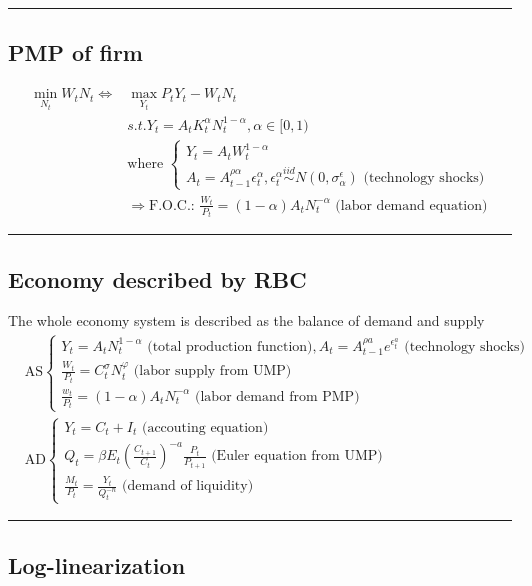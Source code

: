\documentclass{article}
\newcommand*\sepline{%
  \begin{center}
    \rule[1ex]{.5\textwidth}{.5pt}
  \end{center}}
\begin{document}
\sepline
\subsection{PMP of firm}
\begin{align}
\min\limits_{N_{t}} W_t N_t \Leftrightarrow &\max\limits_{Y_t} P_{t}Y_{t}-W_{t}N_{t}
\\&s.t. Y_t = A_t K_t^\alpha N_t^{1-\alpha}, \alpha \in [0,1)
\\&
\text{where } 
\begin{cases}
  Y_{t}=A_{t}W_{t}^{1-\alpha}\\
  A_{t}=A_{t-1}^{\rho\alpha} \epsilon_{t}^{\alpha}, \epsilon_{t}^{\alpha} \overset{iid}{\sim} N(0,\sigma_{\alpha}^{\epsilon})
  \text{ (technology shocks)}
\end{cases}
\\&
\Rightarrow \text{F.O.C.: } \frac{W_{t}}{P_{t}}=(1-\alpha)A_{t}N_{t}^{-\alpha} \text{ (labor demand equation)}
\end{align}

\sepline
\subsection{Economy described by RBC}
{\color{red}
The whole economy system is described as the balance of demand and supply
\begin{align}
&\text{AS}
\begin{cases} Y_{t}=A_{t}N_{t}^{1-\alpha} \text{ (total production function)}, A_t=A^{\rho a}_{t-1} e^{\epsilon^a_t} \text{ (technology shocks)}\\
\frac{W_{t}}{P_{t}}=C_{t}^{\sigma}N_{t}^{\varphi} \text{ (labor supply from UMP)}\\
\frac{w_{t}}{P_{t}}=(1-\alpha)A_{t}N_{t}^{-\alpha} \text{ (labor demand from PMP)}
\end{cases}
\\&
\text{AD}
\begin{cases}Y_{t}=C_{t}+I_{t} \text{ (accouting equation)}\\
Q_{t}=\beta E_{t} (\frac{C_{t+1}}{C_{t}})^{-a} \frac{P_{t}}{P_{t+1}}  \text{ (Euler equation from UMP)}\\
\frac{M_{t}}{P_{t}}=\frac{Y_{t}}{Q_{t}^{-n}}  \text{ (demand of liquidity)}
\end{cases}
\end{align}
}


\sepline
\subsection{Log-linearization}
\end{document}
